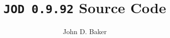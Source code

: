 %
%



\author{John D. Baker}
\title{\texttt{JOD 0.9.92} Source Code}

\setlength{\columnsep}{3em}
\setlength{\columnseprule}{0.5pt}
\twocolumn

\maketitle
\tableofcontents
\onecolumn

\newpage


\newpage


\newpage


\newpage


\newpage


\newpage


%

\newpage
{}
{}
\printindex


